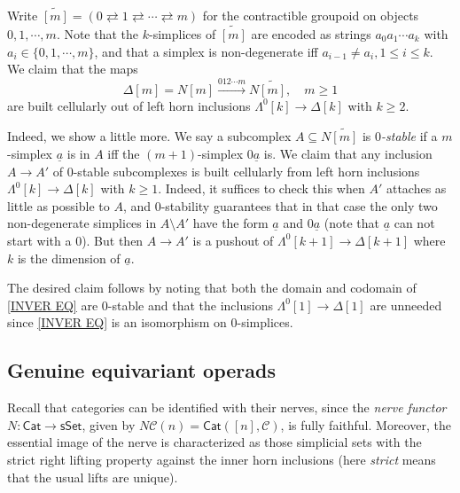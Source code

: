 \documentclass[a4paper,10pt
]{article}%
\begin{document}
\begin{remark}\label{CONTGR REM}
Write 
$\widetilde{[m]} = 
(0 \rightleftarrows 1 
\rightleftarrows \cdots 
\rightleftarrows m)$
for the contractible groupoid on objects $0,1,\cdots,m$. Note that the $k$-simplices of $\widetilde{[m]}$
are encoded as strings $a_0 a_1 \cdots a_k$
with $a_{i} \in \{0,1,\cdots,m\}$, and that a simplex is non-degenerate iff $a_{i-1}\not = a_{i}, 1 \leq i \leq k$.
We claim that the maps
\begin{equation}\label{INVER EQ}
	\Delta[m] = N [m] \xrightarrow{012\cdots m} N \widetilde{[m]},\quad m \geq 1
\end{equation}
are built cellularly out of left horn inclusions $\Lambda^{0}[k] \to \Delta[k]$ with $k\geq 2$.

Indeed, we show a little more. We say a subcomplex 
$A \subseteq N \widetilde{[m]}$ is \textit{$0$-stable}
if a $m$-simplex $\underline{a}$ is in $A$ iff the $(m+1)$-simplex $0\underline{a}$ is.
We claim that any inclusion $A \to A'$ of $0$-stable subcomplexes is built cellularly from left horn inclusions $\Lambda^{0}[k] \to \Delta[k]$ with $k\geq 1$.
Indeed, it suffices to check this when $A'$ attaches as little as 
possible to $A$, and $0$-stability guarantees that in that case the only two non-degenerate simplices in $A \setminus A'$
have the form 
$\underline{a}$ and $0\underline{a}$
(note that $\underline{a}$ can not start with a $0$).
But then $A\to A'$ is a pushout of 
$\Lambda^{0}[k+1] \to \Delta[k+1]$ where $k$ is the dimension of $\underline{a}$.

The desired claim follows by noting that both the domain and codomain of \eqref{INVER EQ} are $0$-stable and that the  inclusions 
$\Lambda^0[1] \to \Delta[1]$ are unneeded since \eqref{INVER EQ} is an isomorphism on $0$-simplices.
\end{remark}



\subsection{Genuine equivariant operads}\label{GENEQOP SEC}


Recall that categories can be identified with their nerves, since the \textit{nerve functor}
$N \colon \mathsf{Cat} \to \mathsf{sSet}$, 
given by $N\mathcal C (n) = \mathsf{Cat}([n], \mathcal C)$, 
is fully faithful.
Moreover, the essential image of the nerve is characterized as those simplicial sets
with the strict right lifting property 
against the inner horn inclusions \cite[Prop. 1.1.2.2]{Lur09}
(here \textit{strict} means that the usual lifts are unique).
\end{document}
